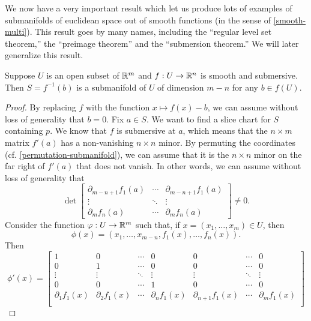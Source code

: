 We now have a very important result which let us produce lots of examples of submanifolds of euclidean space out of smooth functions (in the sense of \cref{smooth-multi}). This result goes by many names, including the ``regular level set theorem,'' the ``preimage theorem'' and the ``submersion theorem.'' We will later generalize this result. 

\begin{theorem} \label{submersion-theorem-local}
	Suppose $U$ is an open subset of $\mathbb{R}^m$ and $f : U \to \mathbb{R}^n$ is smooth and submersive. Then $S = f^{-1}(b)$ is a submanifold of $U$ of dimension $m-n$ for any $b \in f(U)$. 
\end{theorem}

\begin{proof}
	By replacing $f$ with the function $x \mapsto f(x)-b$, we can assume without loss of generality that $b = 0$. Fix $a \in S$. We want to find a slice chart for $S$ containing $p$. We know that $f$ is submersive at $a$, which means that the $n \times m$ matrix $f'(a)$ has a non-vanishing $n \times n$ minor. By permuting the coordinates (cf. \cref{permutation-submanifold}), we can assume that it is the $n \times n$ minor on the far right of $f'(a)$ that does not vanish. In other words, we can assume without loss of generality that  
	\begin{equation} \label{derivative-non-vanishing-minor} 
	\det \begin{bmatrix} \partial_{m-n+1} f_1(a) & \dotsb & \partial_{m-n+1} f_1(a) \\ \vdots & \ddots & \vdots \\ \partial_{m} f_n(a) & \dotsb & \partial_{m} f_n(a) \end{bmatrix} \neq 0. 
	\end{equation} Consider the function $\varphi : U \to \mathbb{R}^m$ such that, if $x = (x_1, \dotsc, x_m) \in U$, then
	\[ \phi(x) = (x_1, \dotsc, x_{m-n}, f_{1}(x), \dotsc, f_n(x)). \]
	Then 
	\[ \phi'(x) = \begin{bmatrix}
	1 & 0 & \dotsb & 0 & 0 & \dotsb & 0 \\
	0 & 1 & \dotsb & 0 & 0 & \dotsb & 0 \\
	\vdots & \vdots & \ddots & \vdots & \vdots & \ddots & \vdots \\
	0 & 0 & \dotsb & 1 & 0 & \dotsb & 0 \\
	\partial_1 f_{1}(x) & \partial_2 f_{1}(x) & \dotsb & \partial_n f_{1}(x) & \partial_{n+1} f_{1}(x)& \dotsb & \partial_m f_{1}(x) \\ 

\end{bmatrix}\]
\end{proof}
